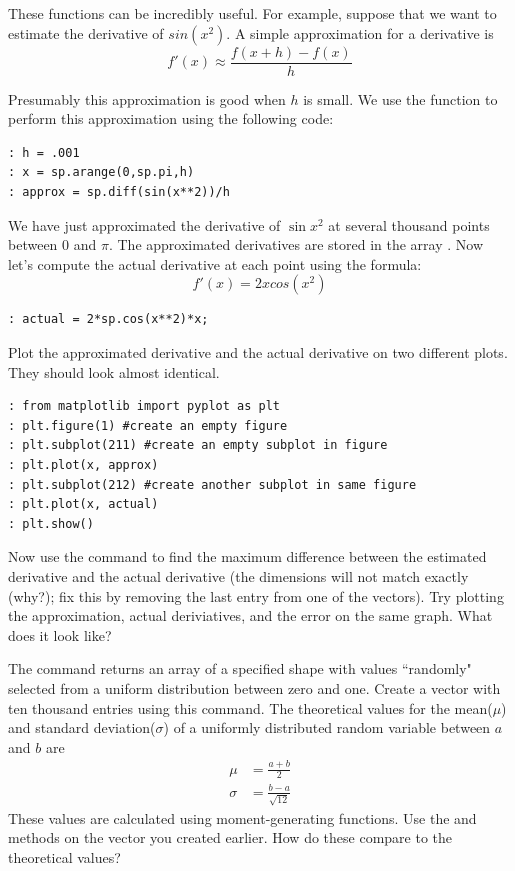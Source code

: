 These functions can be incredibly useful. For example, suppose that we want to
estimate the derivative of $sin(x^2)$. A simple approximation for a derivative
is
\[
f'(x) \approx \frac{f(x+h) - f(x)}{h}
\]

Presumably this approximation is good when $h$ is small. We use the 
function to perform this approximation using the following code:

\begin{lstlisting}
: h = .001
: x = sp.arange(0,sp.pi,h)
: approx = sp.diff(sin(x**2))/h
\end{lstlisting}

We have just approximated the derivative of $\sin{x^2}$ at several thousand points between $0$ and $\pi$.  The approximated derivatives are stored in the array .  Now let's compute the actual derivative at each point using the formula:
\[
f'(x) = 2x cos(x^2)
\]
\begin{lstlisting}
: actual = 2*sp.cos(x**2)*x;
\end{lstlisting}

Plot the approximated derivative and the actual derivative on two different
plots.  They should look almost identical.
\begin{lstlisting}
: from matplotlib import pyplot as plt
: plt.figure(1) #create an empty figure
: plt.subplot(211) #create an empty subplot in figure
: plt.plot(x, approx)
: plt.subplot(212) #create another subplot in same figure
: plt.plot(x, actual)
: plt.show()
\end{lstlisting}

\begin{problem}
Now use the  command to find the maximum difference between the estimated derivative and the actual derivative
(the dimensions will not match exactly (why?);  fix this by removing
the last entry from one of the vectors).  Try plotting the approximation, actual deriviatives, and the error on the same graph.  What does it look like?
\end{problem}

\begin{problem}
The command  returns an array of a specified shape with values ``randomly" selected from a uniform distribution between zero and one. Create a  vector with ten thousand entries using this command. The theoretical values for the mean($\mu$)
and standard deviation($\sigma$) of a uniformly distributed random variable
between $a$ and $b$ are
\begin{align*}
\mu &= \frac{a+b}{2} \\
\sigma &= \frac{b-a}{\sqrt{12}}
\end{align*}
These values are calculated using moment-generating functions. Use the 
 and  methods on the vector you created earlier. How do these compare to the theoretical values?
\end{problem}

